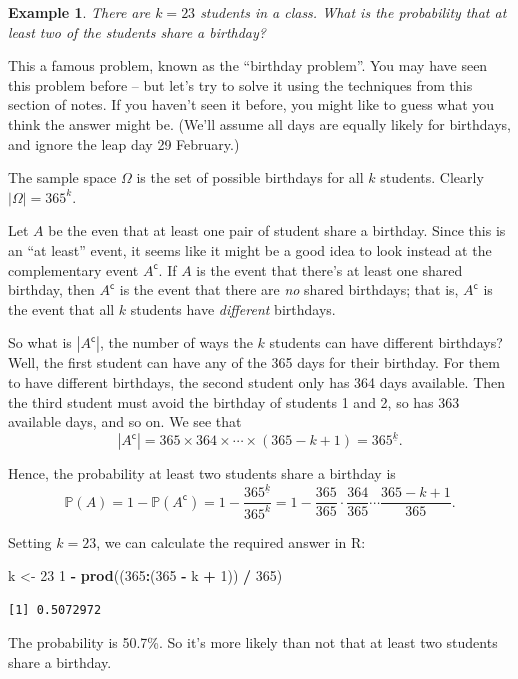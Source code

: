 \documentclass[
  a4paper,
]{book}
\newenvironment{Shaded}{\begin{snugshade}}{\end{snugshade}}
\newcommand{\DecValTok}[1]{\textcolor[rgb]{0.00,0.00,0.81}{#1}}
\newcommand{\FunctionTok}[1]{\textcolor[rgb]{0.13,0.29,0.53}{\textbf{#1}}}
\newcommand{\NormalTok}[1]{#1}
\newcommand{\OtherTok}[1]{\textcolor[rgb]{0.56,0.35,0.01}{#1}}
\newcommand{\SpecialCharTok}[1]{\textcolor[rgb]{0.81,0.36,0.00}{\textbf{#1}}}
\theoremstyle{definition}
\theoremstyle{definition}
\newtheorem{example}{Example}[chapter]
\theoremstyle{definition}
\theoremstyle{definition}
\theoremstyle{remark}
\begin{document}
\begin{example}
\emph{There are \(k = 23\) students in a class. What is the probability that at least two of the students share a birthday?}

This a famous problem, known as the ``birthday problem''. You may have seen this problem before -- but let's try to solve it using the techniques from this section of notes. If you haven't seen it before, you might like to guess what you think the answer might be. (We'll assume all days are equally likely for birthdays, and ignore the leap day 29 February.)

The sample space \(\Omega\) is the set of possible birthdays for all \(k\) students. Clearly \(|\Omega| = 365^k\).

Let \(A\) be the even that at least one pair of student share a birthday. Since this is an ``at least'' event, it seems like it might be a good idea to look instead at the complementary event \(A^\mathsf{c}\). If \(A\) is the event that there's at least one shared birthday, then \(A^\mathsf{c}\) is the event that there are \emph{no} shared birthdays; that is, \(A^\mathsf{c}\) is the event that all \(k\) students have \emph{different} birthdays.

So what is \(|A^\mathsf{c}|\), the number of ways the \(k\) students can have different birthdays? Well, the first student can have any of the 365 days for their birthday. For them to have different birthdays, the second student only has 364 days available. Then the third student must avoid the birthday of students 1 and 2, so has 363 available days, and so on. We see that
\[ |A^\mathsf{c}| = 365 \times 364 \times \cdots \times (365 - k + 1) = 365^{\underline{k}} . \]

Hence, the probability at least two students share a birthday is
\[ \mathbb P(A) = 1 - \mathbb P(A^\mathsf{c}) = 1 - \frac{365^{\underline{k}}}{365^k} = 1 - \frac{365}{365} \cdot \frac{364}{365} \cdots \frac{365-k+1}{365} . \]

Setting \(k = 23\), we can calculate the required answer in R:

\begin{Shaded}
\begin{Highlighting}[]
\NormalTok{k }\OtherTok{\textless{}{-}} \DecValTok{23}
\DecValTok{1} \SpecialCharTok{{-}} \FunctionTok{prod}\NormalTok{((}\DecValTok{365}\SpecialCharTok{:}\NormalTok{(}\DecValTok{365} \SpecialCharTok{{-}}\NormalTok{ k }\SpecialCharTok{+} \DecValTok{1}\NormalTok{)) }\SpecialCharTok{/} \DecValTok{365}\NormalTok{)}
\end{Highlighting}
\end{Shaded}

\begin{verbatim}
[1] 0.5072972
\end{verbatim}

The probability is 50.7\%. So it's more likely than not that at least two students share a birthday.
\end{example}
\end{document}
